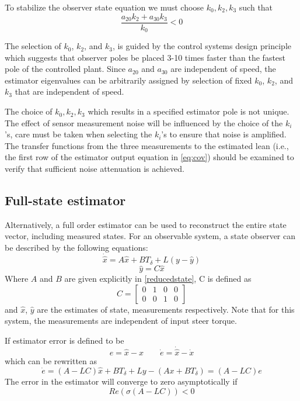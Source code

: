 \documentclass[letterpaper,11pt]{article}
\begin{document}
To stabilize the observer state equation we must choose $k_0, k_2, k_3$ such
that
\begin{equation*}
\frac{a_{20} k_{2} + a_{30} k_{3}}{k_{0}} < 0
\end{equation*}

The selection of $k_0$, $k_2$, and $k_3$, is guided by the control systems
design principle which suggests that observer poles be placed 3-10 times faster
than the fastest pole of the controlled plant. Since $a_{20}$ and $a_{30}$ are
independent of speed, the estimator eigenvalues can be arbitrarily assigned by
selection of fixed $k_0$, $k_2$, and $k_3$ that are independent of speed.

The choice of $k_0, k_2, k_3$ which results in a specified estimator pole is
not unique. The effect of sensor measurement noise will be influenced by the
choice of the $k_i$'s, care must be taken when selecting the $k_i$'s to ensure
that noise is amplified. The transfer functions from the three measurements to
the estimated lean (i.e., the first row of the estimator output equation in
\autoref{eq:cov}) should be examined to verify that sufficient noise
attenuation is achieved.

\subsection{Full-state estimator} \label{fullstate}
Alternatively, a full order estimator can be used to reconstruct the entire
state vector, including measured states. For an observable system, a state
observer can be described by the following equations:
\begin{equation*}
\dot{\hat{x}} = A \hat{x} + B T_\delta + L \left(y - \hat{y}\right)
\end{equation*}
\begin{equation*}
\hat{y} = C \hat{x}
\end{equation*}
Where $A$ and $B$ are given explicitly in \autoref{reducedstate}, C is defined as
\begin{equation*}
C = \left[\begin{smallmatrix}0 & 1 & 0 & 0\\0 & 0 & 1 & 0\end{smallmatrix}\right]
\end{equation*}
and $\hat{x}$, $\hat{y}$ are the estimates of state, measurements respectively.
Note that for this system, the measurements are independent of input steer
torque.

If estimator error is defined to be
\begin{equation*}
e = \hat{x} - x
\qquad
\dot{e} = \dot{\hat{x}} - \dot{x}
\end{equation*}
which can be rewritten as
\begin{equation*}
\dot{e} = \left(A - LC\right) \hat{x} + B T_\delta + L y - \left(A x + B T_\delta\right)
= \left(A - LC\right) e
\end{equation*}
The error in the estimator will converge to zero asymptotically if
\begin{equation*}
Re\left(\sigma\left(A - LC\right)\right) < 0
\end{equation*}
\end{document}
